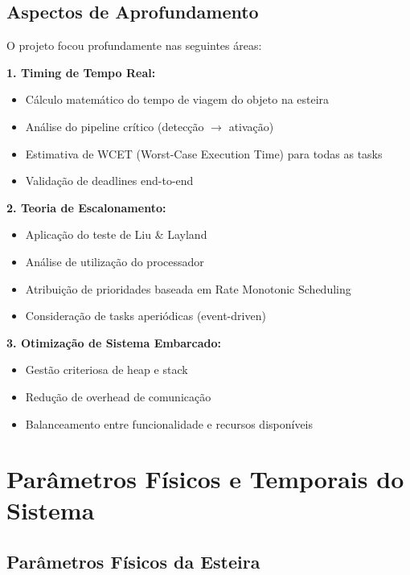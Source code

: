 \documentclass[12pt,a4paper]{article}
\begin{document}
\subsection{Aspectos de Aprofundamento}

O projeto focou profundamente nas seguintes áreas:

\textbf{1. Timing de Tempo Real:}
\begin{itemize}
    \item Cálculo matemático do tempo de viagem do objeto na esteira
    \item Análise do pipeline crítico (detecção $\rightarrow$ ativação)
    \item Estimativa de WCET (Worst-Case Execution Time) para todas as tasks
    \item Validação de deadlines end-to-end
\end{itemize}

\textbf{2. Teoria de Escalonamento:}
\begin{itemize}
    \item Aplicação do teste de Liu \& Layland
    \item Análise de utilização do processador
    \item Atribuição de prioridades baseada em Rate Monotonic Scheduling
    \item Consideração de tasks aperiódicas (event-driven)
\end{itemize}

\textbf{3. Otimização de Sistema Embarcado:}
\begin{itemize}
    \item Gestão criteriosa de heap e stack
    \item Redução de overhead de comunicação
    \item Balanceamento entre funcionalidade e recursos disponíveis
\end{itemize}

\section{Parâmetros Físicos e Temporais do Sistema}

\subsection{Parâmetros Físicos da Esteira}
\end{document}
